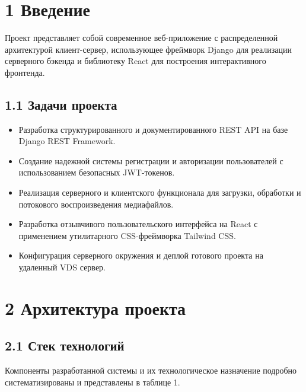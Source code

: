 \documentclass[a4paper,14pt,oneside,openany]{memoir}
\begin{document}
\section{1 Введение}

Проект представляет собой современное веб-приложение с распределенной архитектурой клиент-сервер, использующее фреймворк Django для реализации серверного бэкенда и библиотеку React для построения интерактивного фронтенда.

\subsection{1.1 Задачи проекта}
\begin{itemize}
    \item Разработка структурированного и документированного REST API на базе Django REST Framework.
    \item Создание надежной системы регистрации и авторизации пользователей с использованием безопасных JWT-токенов.
    \item Реализация серверного и клиентского функционала для загрузки, обработки и потокового воспроизведения медиафайлов.
    \item Разработка отзывчивого пользовательского интерфейса на React с применением утилитарного CSS-фреймворка Tailwind CSS.
    \item Конфигурация серверного окружения и деплой готового проекта на удаленный VDS сервер.
\end{itemize}

\section{2 Архитектура проекта}

\subsection{2.1 Стек технологий}
Компоненты разработанной системы и их технологическое назначение подробно систематизированы и представлены в таблице 1.
\end{document}
